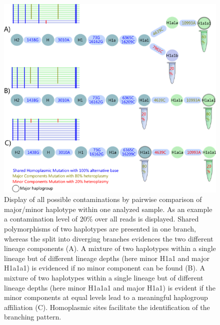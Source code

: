 \begin{figure}[!ht]
    \centering
    \includegraphics[width=1\textwidth]{images/heteroplasmy.png}
    \caption[Display of all possible pairwise sample contamination]{Display of all possible contaminations by pairwise comparison of major/minor haplotype within one analyzed sample. As an example a contamination level of 20\% over all reads is displayed. Shared polymorphisms of two haplotypes are presented in one branch, whereas the split into diverging branches evidences the two different lineage components (A). A mixture of two haplotypes within a single lineage but of different lineage depths (here minor H1a1 and major H1a1a1) is evidenced if no minor component can be found (B). A mixture of two haplotypes within a single lineage but of different lineage depths (here minor H1a1a1 and major H1a1) is evident if the minor components at equal levels lead to a meaningful haplogroup affiliation (C). Homoplasmic sites facilitate the identification of the branching pattern.} 
    \label{app:galaxy-boxplot}
\end{figure}

